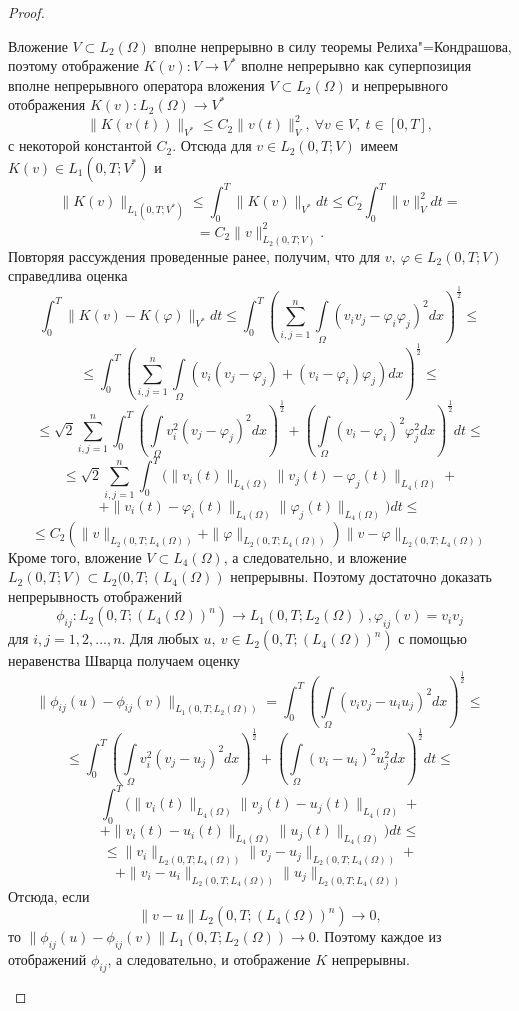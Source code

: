 \begin{proof}
\begin{enumerate}
        Вложение $V\subset L_2(\Omega)$ вполне непрерывно в силу теоремы Релиха"=Кондрашова, поэтому отображение $K(v):V\rightarrow V^*$
        вполне непрерывно как суперпозиция вполне непрерывного оператора вложения $V\subset L_2(\Omega)$ и непрерывного отображения
        $K(v):L_2(\Omega)\rightarrow V^*$
        $$\| K(v(t)) \|_{V^\ast} \le C_2 \| v(t) \|^2_V, \ \forall v \in V, \ t \in [0, T],$$
        с некоторой константой $C_2$.
        Отсюда для $v \in L_2(0, T; V)$ имеем $K(v) \in L_1(0, T; V^\ast)$ и
        $$\| K(v)\|_{L_1(0, T; V^*)}\le\int_0^T\| K(v)\|_{V^*}dt\le C_2\int_0^T\| v\|_V^2dt=$$
        $$=C_2\| v\|_{L_2(0, T; V)}^2.$$
        Повторяя рассуждения проведенные ранее, получим, что для $v, \ \varphi \in L_2(0, T; V)$ справедлива оценка
        $$\int_0^T \| K(v)-K(\varphi)\|_{V^*}dt\le\int_0^T (\sum_{i, j=1}^n\int\limits_\Omega (v_iv_j-\varphi_i \varphi_j)^2dx)^\frac{1}{2}\le$$
        $$\le\int_0^T(\sum_{i, j=1}^n\int\limits_\Omega (v_i(v_j-\varphi_j)+(v_i-\varphi_i)\varphi_j)dx)^\frac{1}{2}\le$$
        $$\le\sqrt{2}\sum_{i, j=1}^n\int_0^T(\int\limits_\Omega v_i^2(v_j-\varphi_j)^2dx)^\frac{1}{2}+(\int\limits_\Omega(v_i-\varphi_i)^2 \varphi_j^2dx)^\frac{1}{2}dt\le$$
        $$\le\sqrt{2}\sum_{i, j=1}^n\int_0^T(\| v_i(t)\|_{L_4(\Omega)}\| v_j(t)-\varphi_j(t)\|_{L_4(\Omega)}+$$
        $$+\| v_i(t)-\varphi_i(t)\|_{L_4(\Omega)}\| \varphi_j(t)\|_{L_4(\Omega)})dt\le$$
        $$\le C_2(\| v \|_{L_2(0, T; L_4(\Omega))}+
        \| \varphi \|_{L_2(0, T; L_4(\Omega))})\| v-\varphi \|_{L_2(0, T; L_4(\Omega))}$$
        Кроме того, вложение $V \subset L_4(\Omega)$, а следовательно, и вложение $L_2(0, T; V) \subset L_2(0, T; (L_4(\Omega))$
        непрерывны. Поэтому достаточно доказать непрерывность отображений
        $$\phi_{ij}: L_2(0, T; (L_4(\Omega))^n) \rightarrow L_1(0, T; L_2(\Omega)), \varphi_{ij}(v) = v_i v_j$$
        для $i, j = 1, 2, \dots, n$.
        Для любых $u, \ v \in L_2(0, T; (L_4(\Omega))^n)$ с помощью неравенства Шварца получаем оценку
        $$\|\phi_{ij}(u)-\phi_{ij}(v)\|_{L_1(0, T; L_2(\Omega))}=\int_0^T(\int\limits_\Omega(v_iv_j-u_iu_j)^2dx)^\frac{1}{2}\le$$
        $$\le\int_0^T(\int\limits_\Omega v_i^2(v_j-u_j)^2dx)^\frac{1}{2}+(\int\limits_\Omega (v_i-u_i)^2u_j^2dx)^\frac{1}{2}dt\le$$
        $$\int_0^T(\| v_i(t)\|_{L_4(\Omega)}\| v_j(t)-u_j(t)\|_{L_4(\Omega)}+$$
        $$+\| v_i(t)-u_i(t)\|_{L_4(\Omega)}\| u_j(t)\|_{L_4(\Omega)})dt\le$$
        $$\le\| v_i\|_{L_2(0, T; L_4(\Omega))}\| v_j-u_j\|_{L_2(0, T; L_4(\Omega))}+$$
        $$+\| v_i-u_i\|_{L_2(0, T; L_4(\Omega))}\| u_j\|_{L_2(0, T; L_4(\Omega))}$$
        Отсюда, если
        $$\| v - u \| L_2(0, T; (L_4(\Omega))^n) \rightarrow 0,$$
        то $\| \phi_{ij}(u) - \phi_{ij}(v) \| L_1(0, T; L_2(\Omega)) \rightarrow 0$.
        Поэтому каждое из отображений $\phi_{ij}$, а следовательно, и отображение $K$ непрерывны.
    \end{enumerate}
\end{proof}

